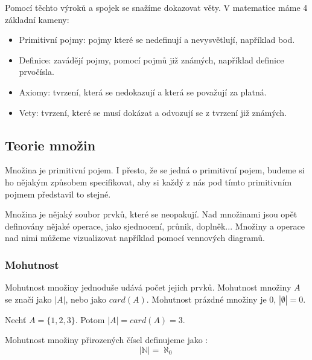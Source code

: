 Pomocí těchto výroků a spojek se snažíme dokazovat věty. V matematice máme 4 základní kameny:
\begin{itemize}
	\item Primitivní pojmy: pojmy které se nedefinují a nevysvětlují, například bod.
	\item Definice: zavádějí pojmy, pomocí pojmů již známých, například definice prvočísla.
	\item Axiomy: tvrzení, která se nedokazují a která se považují za platná.
	\item Vety: tvrzení, které se musí dokázat a odvozují se z tvrzení již známých.
\end{itemize}

\subsection{Teorie množin}

Množina je primitivní pojem. I přesto, že se jedná o primitivní pojem, budeme si ho nějakým
způsobem specifikovat, aby si každý z nás pod tímto primitivním pojmem představil to stejné.

\begin{concept}[Množina]
Množina je nějaký soubor prvků, které se neopakují.
Nad množinami jsou opět definovány nějaké operace, jako sjednocení, průnik, doplněk...
Množiny a operace nad nimi můžeme vizualizovat například pomocí vennových diagramů.
\end{concept}

\subsubsection*{Mohutnost}
\begin{concept}
    Mohutnost množiny jednoduše udává počet jejich prvků. Mohutnost množiny $A$ se značí
    jako $|A|$, nebo jako $card(A)$.
    Mohutnost prázdné množiny je 0, $|\emptyset| = 0$.
\end{concept}
\begin{example}
    Nechť $A = \{1, 2, 3\}$. Potom $|A| = card(A) = 3$.
\end{example}

\begin{definition}
	Mohutnost množiny přirozených čísel definujeme jako :
    $$|\mathbb{N}|=\aleph_0$$
\end{definition}

